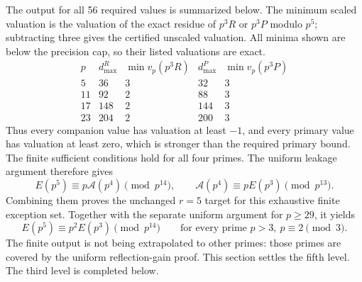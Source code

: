 \documentclass[11pt,letterpaper]{article}
\numberwithin{equation}{section}
\begin{document}
The output for all 56 required values is summarized below. The
minimum scaled valuation is the valuation of the exact residue of
$p^3R$ or $p^3P$ modulo $p^5$; subtracting three gives the certified
unscaled valuation. All minima shown are below the precision cap,
so their listed valuations are exact.
\[
\begin{array}{c|r|r|r|r}
p&d_{\max}^{R}&\min v_p(p^3R)&d_{\max}^{P}&\min v_p(p^3P)\\\hline
5 &36 &3&32 &3\\
11&92 &2&88 &3\\
17&148&2&144&3\\
23&204&2&200&3
\end{array}
\]
Thus every companion value has valuation at least $-1$, and every
primary value has valuation at least zero, which is stronger than the
required primary bound. The finite sufficient conditions hold for
all four primes. The uniform leakage argument therefore gives
\[
 E(p^5)\equiv p\mathcal A(p^4)\pmod{p^{14}},\qquad
 \mathcal A(p^4)\equiv pE(p^3)\pmod{p^{13}}.
\]
Combining them proves the unchanged $r=5$ target for this exhaustive
finite exception set. Together with the separate uniform argument
for $p\ge29$, it yields
\[
 \boxed{E(p^5)\equiv p^2E(p^3)\pmod{p^{14}}
 \qquad\text{for every prime }p>3,\ p\equiv2\pmod3.}
\]
The finite output is not being extrapolated to other primes: those
primes are covered by the uniform reflection-gain proof. This section
settles the fifth level. The third level is completed below.
\end{document}
